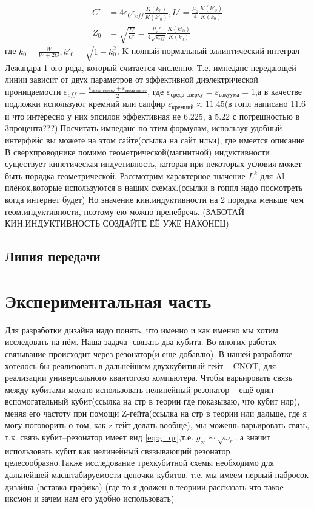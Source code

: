 \documentclass[12pt, twoside]{report}
\begin{document}
	\begin{align*}
	C'&=4\varepsilon_0\varepsilon_{eff}\frac{K(k_0)}{K(k'_0)},
	L'=\frac{\mu_0}{4}\frac{K(k'_0)}{K(k_0)}\\
	Z_0&=\sqrt{\frac{L'}{C'}}	=\frac{\mu_o c}{4\sqrt{\varepsilon_{eff}}}\frac{K(k'_0)}{K(k_0)}
	\end{align*}
где $k_0=\frac{W}{W+2G},k'_0=\sqrt{1-k_0^2}$, K-полный нормальный эллиптический интеграл Лежандра 1-ого рода, который считается численно.
Т.е. импеданс передающей линии зависит от двух параметров от эффективной диэлектрической проницаемости $\varepsilon_{eff}=\frac{\varepsilon_{\text{среда сверху}}+\varepsilon_{\text{среда снизу}}}{2}$, где $\varepsilon_{\text{среда сверху}}=\varepsilon_{\text{вакуума}}=1$,а в качестве подложки используют кремний или сапфир $\varepsilon_{\text{кремний}}\approx11.45$(в гопл написано 11.6 и что интересно у них эпсилон эффективная не 6.225, а 5.22 с погрешностью в 3процента???).Посчитать импеданс по этим формулам, используя удобный интерфейс вы можете на этом сайте(ссылка на сайт ильи), где имеется описание. В сверхпроводнике помимо геометрической(магнитной) индуктивности существует кинетическая индуетивность\cite{Goppl2008}, которая при некоторых условия может быть порядка геометрической. Рассмотрим характерное значение $L^k$ для Al плёнок,которые используются в наших схемах.(ссылки в гоппл надо посмотреть когда интернет будет) Но значение кин.индуктивности на 2 порядка меньше чем геом.индуктивности, поэтому ею можно пренебречь.
(ЗАБОТАЙ КИН.ИНДУКТИВНОСТЬ СОЗДАЙТЕ ЕЁ УЖЕ НАКОНЕЦ)
\newpage
	\section{Линия передачи}%
	




\chapter{Экспериментальная часть} \label{chap:exp}
Для разработки дизайна надо понять, что именно и как именно мы хотим исследовать на нём. Наша задача-
связать два кубита. Во многих работах связывание происходит через резонатор\cite{Kelly2015}(и еще добавлю). 
В нашей разработке хотелось бы реализовать в дальнейшем двухкубитный гейт -- CNOT, для реализации универсального квантогово компьютера. Чтобы варьировать связь между кубитами можно использовать нелинейный резонатор -- ещё один вспомогательный кубит(ссылка на стр в теории где показываю, что кубит нлр), меняя его частоту при помощи Z-гейта(ссылка на стр в теории или дальше, где я могу поговорить о том, как z гейт делать вообще), мы можешь варьировать связь, т.к. связь кубит--резонатор имеет вид \eqref{eq:g_qr},т.е. $g_{qr} \sim \sqrt{\omega_r}$, а значит использовать кубит как нелинейный связывающий резонатор целесообразно.Также исследование трехкубитной схемы необходимо для дальнейшей масштабируемости цепочки кубитов.
т.е. мы имеем первый набросок дизайна
(вставка графика)
(где-то я должен в теориии рассказать что такое иксмон и зачем нам его удобно использовать)
	
\end{document}

